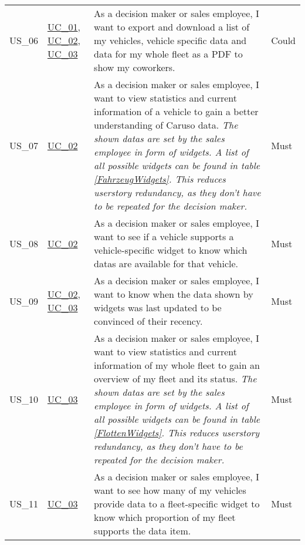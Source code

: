 \begin{footnotesize}
\begin{longtable}[L L L L]{ p{} p{} p{} p{}}
      \rowcolor{Gray}
      \hypertarget{Ref:US6}{US\_06} & \hyperlink{Ref:UC1}{UC\_01}, \newline \hyperlink{Ref:UC2}{UC\_02}, \newline \hyperlink{Ref:UC3}{UC\_03} & As a decision maker or sales employee, I want to export and download a list of my vehicles, vehicle specific data and data for my whole fleet as a PDF to show my coworkers. & Could \\

      \hypertarget{Ref:US7}{US\_07} & \hyperlink{Ref:UC2}{UC\_02} & As a decision maker or sales employee, I want to view statistics and current information of a vehicle to gain a better understanding of Caruso data. 
      \newline
      \emph{The shown \glspl{data} are set by the sales employee in form of \glspl{widget}. A list of all possible \glspl{widget} can be found in table \ref{FahrzeugWidgets}. This reduces \gls{userstory} redundancy, as they don't have to be repeated for the decision maker.} & Must \\

      \rowcolor{Gray}
      \hypertarget{Ref:US8}{US\_08} & \hyperlink{Ref:UC2}{UC\_02} & As a decision maker or sales employee, I want to see if a vehicle supports a vehicle-specific \gls{widget} to know which \glspl{data} are available for that vehicle. & Must
      \\

      \hypertarget{Ref:US9}{US\_09} & \hyperlink{Ref:UC2}{UC\_02}, \newline \hyperlink{Ref:UC3}{UC\_03} & As a decision maker or sales employee, I want to know when the data shown by \glspl{widget} was last updated to be convinced of their recency. & Must
      \\

      \rowcolor{Gray}
      \hypertarget{Ref:US10}{US\_10} & \hyperlink{Ref:UC3}{UC\_03} & As a decision maker or sales employee, I want to view statistics and current information of my whole fleet to gain an overview of my fleet and its status.
      \newline
      \emph{The shown \glspl{data} are set by the sales employee in form of \glspl{widget}. A list of all possible \glspl{widget} can be found in table \ref{FlottenWidgets}. This reduces \gls{userstory} redundancy, as they don't have to be repeated for the decision maker.} & Must \\

      \hypertarget{Ref:US11}{US\_11} & \hyperlink{Ref:UC3}{UC\_03} & As a decision maker or sales employee, I want to see how many of my vehicles provide data to a fleet-specific \gls{widget} to know which proportion of my fleet supports the data item. & Must \\


\end{longtable}
\end{footnotesize}
